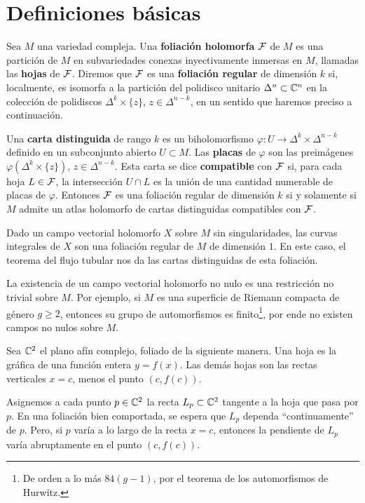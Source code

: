 \section{Definiciones básicas}

Sea $M$ una variedad compleja. Una \textbf{foliación holomorfa} $\mathcal F$ de $M$ es una partición de $M$ en subvariedades conexas inyectivamente inmersas en $M$, llamadas las \textbf{hojas} de $\mathcal F$. Diremos que $\mathcal F$ es una \textbf{foliación regular} de dimensión $k$ si, localmente, es isomorfa a la partición del polidisco unitario $\Delta^n \subset \mathbb C^n$ en la colección de polidiscos $\Delta^k \times \{ z \}$, $z \in \Delta^{n-k}$, en un sentido que haremos preciso a continuación.

Una \textbf{carta distinguida} de rango $k$ es un biholomorfismo $\varphi : U \to \Delta^k \times \Delta^{n-k}$ definido en un subconjunto abierto $U \subset M$. Las \textbf{placas} de $\varphi$ son las preimágenes $\varphi(\Delta^k \times \{ z \})$, $z \in \Delta^{n-k}$. Esta carta se dice \textbf{compatible} con $\mathcal F$ si, para cada hoja $L \in \mathcal F$, la intersección $U \cap L$ es la unión de una cantidad numerable de placas de $\varphi$. Entonces $\mathcal F$ es una foliación regular de dimensión $k$ si y solamente si $M$ admite un atlas holomorfo de cartas distinguidas compatibles con $\mathcal F$.

\begin{example}
Dado un campo vectorial holomorfo $X$ sobre $M$ sin singularidades, las curvas integrales de $X$ son una foliación regular de $M$ de dimensión $1$. En este caso, el teorema del flujo tubular nos da las cartas distinguidas de esta foliación.
\end{example}

\begin{remark}
La existencia de un campo vectorial holomorfo no nulo es una restricción no trivial sobre $M$. Por ejemplo, si $M$ es una superficie de Riemann compacta de género $g \ge 2$, entonces su grupo de automorfismos es finito\footnote{De orden a lo más $84 (g - 1)$, por el teorema de los automorfismos de Hurwitz.}, por ende no existen campos no nulos sobre $M$.
\end{remark}

\begin{example}
Sea $\mathbb C^2$ el plano afín complejo, foliado de la siguiente manera. Una hoja es la gráfica de una función entera $y = f(x)$. Las demás hojas son las rectas verticales $x = c$, menos el punto $(c, f(c))$.

Asignemos a cada punto $p \in \mathbb C^2$ la recta $L_p \subset \mathbb C^2$ tangente a la hoja que pasa por $p$. En una foliación bien comportada, se espera que $L_p$ dependa ``continuamente'' de $p$. Pero, si $p$ varía a lo largo de la recta $x = c$, entonces la pendiente de $L_p$ varía abruptamente en el punto $(c, f(c))$.
\end{example}


